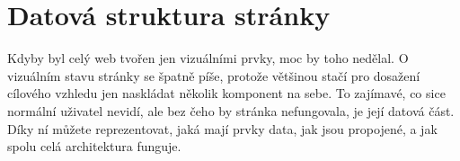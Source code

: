 \section{Datová struktura stránky}

Kdyby byl celý web tvořen jen vizuálními prvky, moc by toho nedělal. O vizuálním stavu stránky se špatně píše, protože většinou stačí pro dosažení cílového vzhledu jen naskládat několik komponent na sebe. To zajímavé, co sice normální uživatel nevidí, ale bez čeho by stránka nefungovala, je její datová část. Díky ní můžete reprezentovat, jaká mají prvky data, jak jsou propojené, a jak spolu celá architektura funguje.


\newpage

\newpage

\newpage